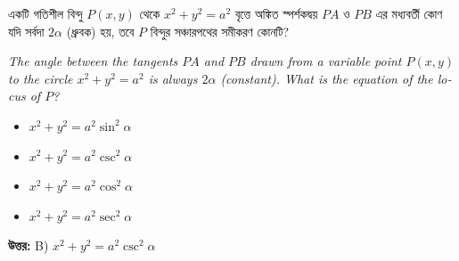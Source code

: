 \documentclass[12pt, a4paper]{article}
\begin{document}
\vspace{2em}

\begin{tcolorbox}[questionbox={প্রশ্ন (Question) 41}]
    \noindent
    একটি গতিশীল বিন্দু $P(x, y)$ থেকে $x^2 + y^2 = a^2$ বৃত্তে অঙ্কিত স্পর্শকদ্বয় $PA$ ও $PB$ এর মধ্যবর্তী কোণ যদি সর্বদা $2\alpha$ (ধ্রুবক) হয়, তবে $P$ বিন্দুর সঞ্চারপথের সমীকরণ কোনটি?
    
    \vspace{0.8em}
    \begin{english}
    \noindent\textit{\color{darkgray}
    The angle between the tangents $PA$ and $PB$ drawn from a variable point $P(x, y)$ to the circle $x^2 + y^2 = a^2$ is always $2\alpha$ (constant). What is the equation of the locus of $P$?
    }
    \end{english}
\end{tcolorbox}

\begin{itemize}[label={}, leftmargin=1cm, itemsep=0.5em]
    \item[\textbf{A)}] $x^2 + y^2 = a^2 \sin^2\alpha$
    \item[\textbf{B)}] $x^2 + y^2 = a^2 \csc^2\alpha$
    \item[\textbf{C)}] $x^2 + y^2 = a^2 \cos^2\alpha$
    \item[\textbf{D)}] $x^2 + y^2 = a^2 \sec^2\alpha$
\end{itemize}

\vspace{0.5em}
\begin{tcolorbox}[answerbox]
    \textbf{\color{success} উত্তর:} B) $x^2 + y^2 = a^2 \csc^2\alpha$
\end{tcolorbox}
\vspace{1em}
\end{document}
